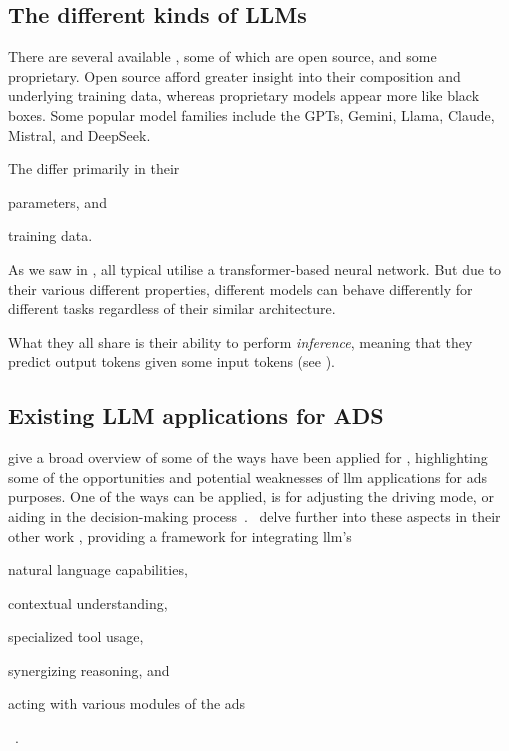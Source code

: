 

\subsection{The different kinds of LLMs}\label{sec:llmJungle}

There are several available , some of which are open source, and some proprietary.
Open source  afford greater insight into their composition and underlying training
data, whereas proprietary models appear more like black boxes. Some popular model families include
the GPTs, Gemini, Llama, Claude, Mistral, and DeepSeek.

The  differ primarily in their \begin{inparaenum}
    \item parameters, and
    \item training data.
\end{inparaenum}
As we saw in , all typical  utilise a transformer-based neural
network. But due to their various different properties, different models can behave differently for
different tasks regardless of their similar architecture.

What they all share is their ability to perform \textit{inference}, meaning that they predict output
tokens given some input tokens (see ).

\subsection{Existing LLM applications for ADS}\label{sec:llmsForAds}


\citeauthor{LLM4AD} give a broad overview of some of the ways  have been applied for
, highlighting some of the opportunities and potential weaknesses of \acrshort{llm}
applications for \acrshort{ads} purposes. One of the ways  can be applied, is for
adjusting the driving mode, or aiding in the decision-making
process~\cite[1]{LLM4AD}.~\citeauthor{driveAsYouSpeak} delve further into these aspects in their
other work , providing a framework for integrating \acrlong{llm}'s
\begin{inparaenum}
    \item natural language capabilities,
    \item contextual understanding,
    \item specialized tool usage,
    \item synergizing reasoning, and
    \item acting with various modules of the \acrshort{ads}
\end{inparaenum}~\cite[1]{driveAsYouSpeak}.
